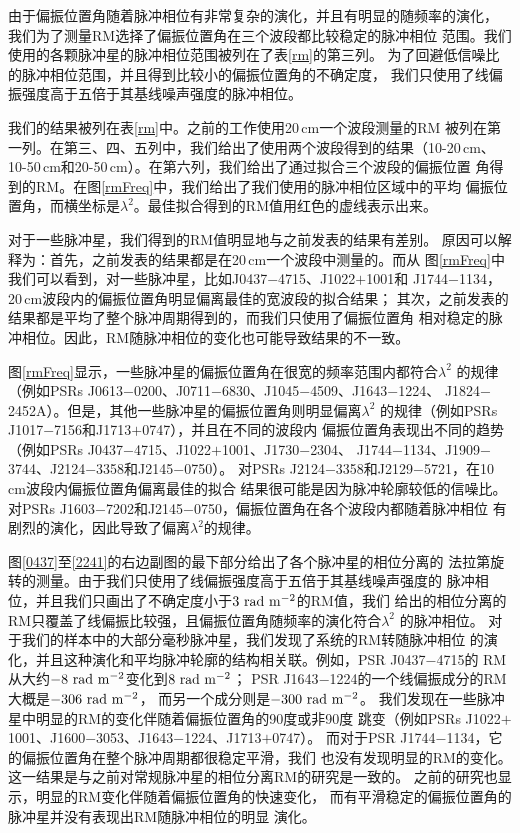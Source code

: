 由于偏振位置角随着脉冲相位有非常复杂的演化，并且有明显的随频率的演化，
我们为了测量RM选择了偏振位置角在三个波段都比较稳定的脉冲相位
范围。我们使用的各颗脉冲星的脉冲相位范围被列在了表\ref{rm}的第三列。
为了回避低信噪比的脉冲相位范围，并且得到比较小的偏振位置角的不确定度，
我们只使用了线偏振强度高于五倍于其基线噪声强度的脉冲相位。

我们的结果被列在表\ref{rm}中。之前的工作使用20\,cm一个波段测量的RM
被列在第一列。在第三、四、五列中，我们给出了使用两个波段得到的结果（10-20\,cm、
10-50\,cm和20-50\,cm）。在第六列，我们给出了通过拟合三个波段的偏振位置
角得到的RM。在图\ref{rmFreq}中，我们给出了我们使用的脉冲相位区域中的平均
偏振位置角，而横坐标是$\lambda^2$。最佳拟合得到的RM值用红色的虚线表示出来。

对于一些脉冲星，我们得到的RM值明显地与之前发表的结果有差别。
原因可以解释为：首先，之前发表的结果都是在20\,cm一个波段中测量的。而从
图\ref{rmFreq}中我们可以看到，对一些脉冲星，比如J0437$-$4715、J1022$+$1001和
J1744$-$1134，20\,cm波段内的偏振位置角明显偏离最佳的宽波段的拟合结果；
其次，之前发表的结果都是平均了整个脉冲周期得到的，而我们只使用了偏振位置角
相对稳定的脉冲相位。因此，RM随脉冲相位的变化也可能导致结果的不一致。

图\ref{rmFreq}显示，一些脉冲星的偏振位置角在很宽的频率范围内都符合$\lambda^2$
的规律（例如PSRs J0613$-$0200、J0711$-$6830、J1045$-$4509、J1643$-$1224、
J1824$-$2452A）。但是，其他一些脉冲星的偏振位置角则明显偏离$\lambda^2$
的规律（例如PSRs J1017$-$7156和J1713$+$0747），并且在不同的波段内
偏振位置角表现出不同的趋势（例如PSRs J0437$-$4715、J1022$+$1001、J1730$-$2304、
J1744$-$1134、J1909$-$3744、J2124$-$3358和J2145$-$0750）。
%
对PSRs J2124$-$3358和J2129$-$5721，在10\,cm波段内偏振位置角偏离最佳的拟合
结果很可能是因为脉冲轮廓较低的信噪比。 
%
对PSRs J1603$-$7202和J2145$-$0750，偏振位置角在各个波段内都随着脉冲相位
有剧烈的演化，因此导致了偏离$\lambda^2$的规律。

图\ref{0437}至\ref{2241}的右边副图的最下部分给出了各个脉冲星的相位分离的
法拉第旋转的测量。由于我们只使用了线偏振强度高于五倍于其基线噪声强度的
脉冲相位，并且我们只画出了不确定度小于$3\ \rm{rad\ m^{-2}}$的RM值，我们
给出的相位分离的RM只覆盖了线偏振比较强，且偏振位置角随频率的演化符合$\lambda^2$
的脉冲相位。
%
对于我们的样本中的大部分毫秒脉冲星，我们发现了系统的RM转随脉冲相位
的演化，并且这种演化和平均脉冲轮廓的结构相关联。例如，PSR J0437$-$4715的
RM从大约$-8\ \rm{rad\ m^{-2}}$变化到$8\ \rm{rad\ m^{-2}}$；
PSR J1643$-$1224的一个线偏振成分的RM大概是$-306\ \rm{rad\ m^{-2}}$，
而另一个成分则是$-300\ \rm{rad\ m^{-2}}$。
%
我们发现在一些脉冲星中明显的RM的变化伴随着偏振位置角的90度或非90度
跳变（例如PSRs J1022$+$1001、J1600$-$3053、J1643$-$1224、J1713$+$0747）。
而对于PSR J1744$-$1134，它的偏振位置角在整个脉冲周期都很稳定平滑，我们
也没有发现明显的RM的变化。
%
这一结果是与之前对常规脉冲星的相位分离RM的研究是一致的。
之前的研究也显示，明显的RM变化伴随着偏振位置角的快速变化，
而有平滑稳定的偏振位置角的脉冲星并没有表现出RM随脉冲相位的明显
演化\supercite{Noutsos09}。

